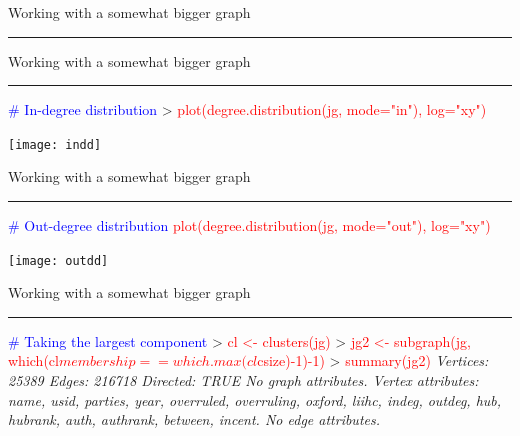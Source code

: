 \documentclass[landscape]{foils}
\newcommand{\stitle}[1]{{\centering\color{blue}\Large #1\par\vspace*{10pt}\hrule}}
\newcommand{\command}[1]{\textcolor{red}{#1}}
\newcommand{\comment}[1]{\textcolor{blue}{#1}}
\begin{document}
\newpage
\stitle{Working with a somewhat bigger graph}

\newpage
\stitle{Working with a somewhat bigger graph}
\begin{Myverb}
\comment{# In-degree distribution}
> \command{plot(degree.distribution(jg, mode="in"), log="xy")}
\end{Myverb}
\begin{center}
\texttt{[image: indd]}
\end{center}

\newpage
\stitle{Working with a somewhat bigger graph}
\begin{Myverb}
\comment{# Out-degree distribution}
\command{plot(degree.distribution(jg, mode="out"), log="xy")}
\end{Myverb}
\begin{center}
\texttt{[image: outdd]}
\end{center}

\newpage
\stitle{Working with a somewhat bigger graph}
\begin{Myverb}
\comment{# Taking the largest component}
> \command{cl <- clusters(jg)}
> \command{jg2 <- subgraph(jg, which(cl$membership == which.max(cl$csize)-1)-1)}
> \command{summary(jg2)}
\slshape Vertices: 25389 
\slshape Edges: 216718 
\slshape Directed: TRUE 
\slshape No graph attributes.
\slshape Vertex attributes: name, usid, parties, year, overruled, overruling, 
\slshape    oxford, liihc, indeg, outdeg, hub, hubrank, auth, authrank, 
\slshape    between, incent.
\slshape No edge attributes.
\end{Myverb}
\end{document}
